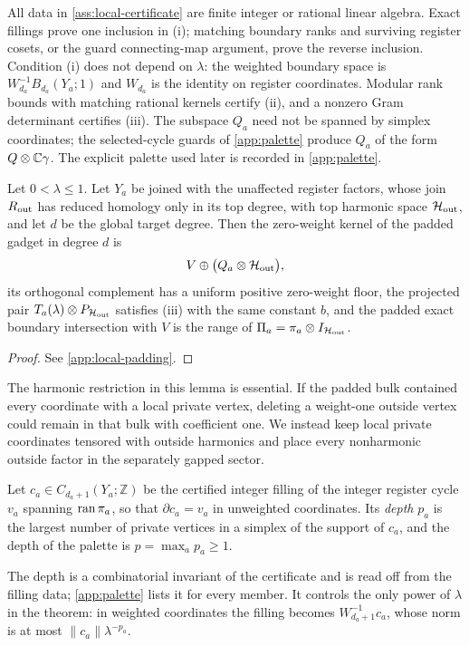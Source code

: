 All data in \cref{ass:local-certificate} are finite integer or rational linear
algebra.  Exact fillings prove one inclusion in (i); matching boundary ranks
and surviving register cosets, or the guard connecting-map argument, prove the
reverse inclusion.  Condition (i) does not depend on \(\lambda\): the
weighted boundary space is \(W_{d_a}^{-1}B_{d_a}(Y_a;1)\) and \(W_{d_a}\)
is the identity on register coordinates.  Modular rank bounds with matching
rational kernels certify (ii), and a nonzero Gram determinant certifies
(iii).  The subspace \(Q_a\) need not be spanned by simplex coordinates; the
selected-cycle guards of \cref{app:palette} produce \(Q_a\) of the form
\(Q\otimes\mathbb{C}\gamma\).  The explicit palette used later is recorded in
\cref{app:palette}.

\begin{lemma}
\label{lem:scaling-padding}
Let \(0<\lambda\le1\).  Let \(Y_a\) be joined with the unaffected register
factors, whose join \(R_{\rm out}\) has reduced homology only in its top
degree, with top harmonic space \(\mathcal{H}_{\rm out}\), and let \(d\) be the
global target degree.  Then the zero-weight kernel of the padded gadget in
degree \(d\) is
\[
V\oplus\bigl(Q_a\otimes\mathcal{H}_{\rm out}\bigr),
\]
its orthogonal complement has a uniform positive zero-weight floor, the
projected pair \(T_a(\lambda)\otimes P_{\mathcal{H}_{\rm out}}\) satisfies (iii)
with the same constant \(b\), and the padded exact boundary intersection
with \(V\) is the range of
\(\Pi_a=\pi_a\otimes I_{\mathcal{H}_{\rm out}}\).
\end{lemma}

\begin{proof}
See \cref{app:local-padding}.
\end{proof}

The harmonic restriction in this lemma is essential.  If the padded bulk
contained every coordinate with a local private vertex, deleting a weight-one
outside vertex could remain in that bulk with coefficient one.  We instead
keep local private coordinates tensored with outside harmonics and place every
nonharmonic outside factor in the separately gapped sector.

\begin{definition}
\label{def:depth}
Let \(c_a\in C_{d_a+1}(Y_a;\mathbb Z)\) be the certified integer filling of
the integer register cycle \(v_a\) spanning \(\operatorname{ran}\pi_a\), so that
\(\partial c_a=v_a\) in unweighted coordinates.  Its \emph{depth} \(p_a\) is
the largest number of private vertices in a simplex of the support of
\(c_a\), and the depth of the palette is \(p=\max_ap_a\ge1\).
\end{definition}
The depth is a combinatorial invariant of the certificate and is read off
from the filling data; \cref{app:palette} lists it for every member.  It
controls the only power of \(\lambda\) in the theorem: in weighted
coordinates the filling becomes \(W_{d_a+1}^{-1}c_a\), whose norm is at most
\(\|c_a\|\lambda^{-p_a}\).

